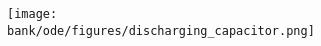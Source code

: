 \begin{figure}[H]
  \begin{center}
    \texttt{[image: \\bank/ode/figures/discharging\_capacitor.png]}
  \end{center}
  \label{fig:discharging_capacitor}
\end{figure}
